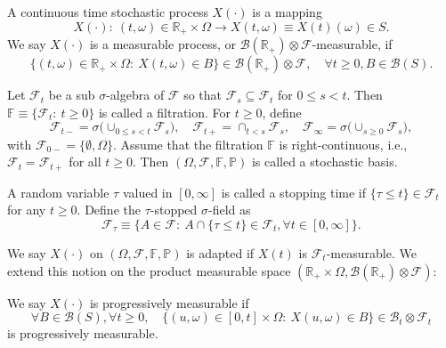 \begin{definition}
A continuous time stochastic process $X(\cdot)$ is a mapping
\[
X(\cdot):~(t,\omega)\in\mathbb{R}_+\times\Omega\to X(t,\omega)\equiv X(t)(\omega)\in S.
\]
We say $X(\cdot)$ is a measurable process, or $\mathcal{B}(\mathbb{R}_+)\otimes\mathcal{F}$-measurable, if
\[
\{(t,\omega)\in\mathbb{R}_+\times\Omega:~X(t,\omega)\in B\}\in \mathcal{B}(\mathbb{R}_+)\otimes\mathcal{F},\quad\forall t\ge0, B\in\mathcal{B}(S).
\]
\end{definition}

\begin{definition}[Filtration]
Let $\mathcal{F}_t$ be a sub $\sigma$-algebra of $\mathcal{F}$ so that $\mathcal{F}_s\subseteq\mathcal{F}_t$ for $0\le s<t$. Then $\mathbb{F}\equiv\{\mathcal{F}_t:~t\ge0\}$ is called a filtration.
For $t\ge0$, define
\[
\mathcal{F}_{t-}=\sigma\bigg(
\cup_{0\le s<t}\mathcal{F}_s
\bigg),\quad
\mathcal{F}_{t+}=\cap_{t<s}\mathcal{F}_s,\quad
\mathcal{F}_\infty=\sigma\bigg(
\cup_{s\ge0}\mathcal{F}_s
\bigg),
\]
with $\mathcal{F}_{0-}=\{\emptyset,\Omega\}$.
Assume that the filtration $\mathbb{F}$ is right-continuous, i.e., $\mathcal{F}_{t}=\mathcal{F}_{t+}$ for all $t\ge0$.
Then $(\Omega,\mathcal{F},\mathbb{F},\mathbb{P})$ is called a stochastic basis.
\end{definition}

\begin{definition}
A random variable $\tau$ valued in $[0,\infty]$ is called a stopping time if $\{\tau\le t\}\in\mathcal{F}_t$ for any $t\ge0$. Define the $\tau$-stopped $\sigma$-field as
\[
\mathcal{F}_{\tau}\equiv\{A\in\mathcal{F}:~A\cap\{\tau\le t\}\in\mathcal{F}_t, \forall t\in[0,\infty]\}.
\]
\end{definition}

We say $X(\cdot)$ on $(\Omega,\mathcal{F},\mathbb{F},\mathbb{P})$ is adapted if $X(t)$ is $\mathcal{F}_t$-measurable. 
We extend this notion on the product measurable space $(\mathbb{R}_+\times\Omega, \mathcal{B}(\mathbb{R}_+)\otimes\mathcal{F})$:
\begin{definition}
We say $X(\cdot)$ is progressively measurable if
\[
\forall B\in\mathcal{B}(S),\forall t\ge0,\quad
\{(u,\omega)\in[0,t]\times\Omega:~X(u,\omega)\in B\}\in\mathcal{B}_t\otimes\mathcal{F}_t
\]
is progressively measurable.
\end{definition}

